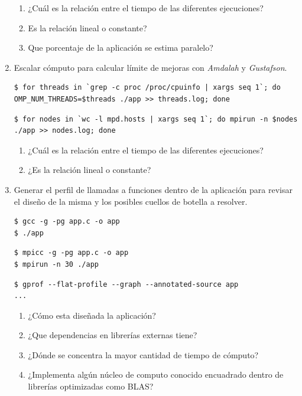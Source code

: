 \documentclass[a4paper]{report}
\begin{document}
\begin{enumerate}
\begin{enumerate}
\item ¿Cuál es la relación entre el tiempo de las diferentes ejecuciones?
\item Es la relación lineal o constante?
\item Que porcentaje de la aplicación se estima paralelo?
\end{enumerate}

\item Escalar cómputo para calcular límite de mejoras con {\it Amdalah} y {\it Gustafson}.

\begin{lstlisting}
$ for threads in `grep -c proc /proc/cpuinfo | xargs seq 1`; do OMP_NUM_THREADS=$threads ./app >> threads.log; done
\end{lstlisting}

\begin{lstlisting}
$ for nodes in `wc -l mpd.hosts | xargs seq 1`; do mpirun -n $nodes ./app >> nodes.log; done
\end{lstlisting}

\begin{enumerate}
\item ¿Cuál es la relación entre el tiempo de las diferentes ejecuciones?
\item ¿Es la relación lineal o constante?
\end{enumerate}

\item Generar el perfil de llamadas a funciones dentro de la aplicación para revisar el diseño de la misma y los posibles cuellos de botella a resolver.

\begin{lstlisting}
$ gcc -g -pg app.c -o app
$ ./app
\end{lstlisting}

\begin{lstlisting}
$ mpicc -g -pg app.c -o app
$ mpirun -n 30 ./app
\end{lstlisting}

\begin{lstlisting}
$ gprof --flat-profile --graph --annotated-source app
...
\end{lstlisting}

\begin{enumerate}
\item ¿Cómo esta diseñada la aplicación?
\item ¿Que dependencias en librerías externas tiene?
\item ¿Dónde se concentra la mayor cantidad de tiempo de cómputo?
\item ¿Implementa algún núcleo de computo conocido encuadrado dentro de librerías optimizadas como BLAS?
\end{enumerate}


\end{enumerate}
\end{document}
